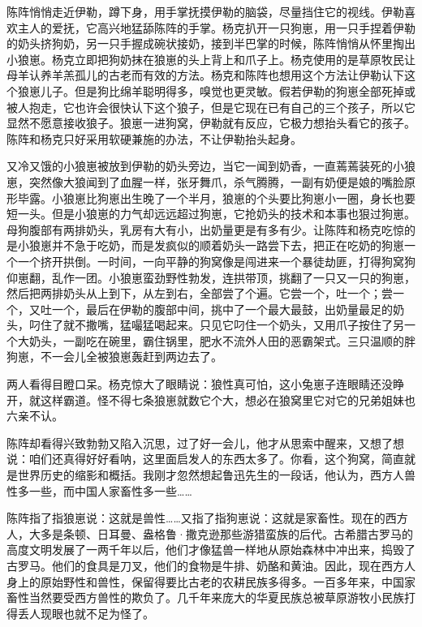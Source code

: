 \par 陈阵悄悄走近伊勒，蹲下身，用手掌抚摸伊勒的脑袋，尽量挡住它的视线。伊勒喜欢主人的爱抚，它高兴地猛舔陈阵的手掌。杨克扒开一只狗崽，用一只手捏着伊勒的奶头挤狗奶，另一只手握成碗状接奶，接到半巴掌的时候，陈阵悄悄从怀里掏出小狼崽。杨克立即把狗奶抹在狼崽的头上背上和爪子上。杨克使用的是草原牧民让母羊认养羊羔孤儿的古老而有效的方法。杨克和陈阵也想用这个方法让伊勒认下这个狼崽儿子。但是狗比绵羊聪明得多，嗅觉也更灵敏。假若伊勒的狗崽全部死掉或被人抱走，它也许会很快认下这个狼子，但是它现在已有自己的三个孩子，所以它显然不愿意接收狼子。狼崽一进狗窝，伊勒就有反应，它极力想抬头看它的孩子。陈阵和杨克只好采用软硬兼施的办法，不让伊勒抬头起身。
\par 又冷又饿的小狼崽被放到伊勒的奶头旁边，当它一闻到奶香，一直蔫蔫装死的小狼崽，突然像大狼闻到了血腥一样，张牙舞爪，杀气腾腾，一副有奶便是娘的嘴脸原形毕露。小狼崽比狗崽出生晚了一个半月，狼崽的个头要比狗崽小一圈，身长也要短一头。但是小狼崽的力气却远远超过狗崽，它抢奶头的技术和本事也狠过狗崽。母狗腹部有两排奶头，乳房有大有小，出奶量更是有多有少。让陈阵和杨克吃惊的是小狼崽并不急于吃奶，而是发疯似的顺着奶头一路尝下去，把正在吃奶的狗崽一个一个挤开拱倒。一时间，一向平静的狗窝像是闯进来一个暴徒劫匪，打得狗窝狗仰崽翻，乱作一团。小狼崽蛮劲野性勃发，连拱带顶，挑翻了一只又一只的狗崽，然后把两排奶头从上到下，从左到右，全部尝了个遍。它尝一个，吐一个；尝一个，又吐一个，最后在伊勒的腹部中间，挑中了一个最大最鼓，出奶量最足的奶头，叼住了就不撒嘴，猛嘬猛喝起来。只见它叼住一个奶头，又用爪子按住了另一个大奶头，一副吃在碗里，霸住锅里，肥水不流外人田的恶霸架式。三只温顺的胖狗崽，不一会儿全被狼崽轰赶到两边去了。
\par 两人看得目瞪口呆。杨克惊大了眼睛说：狼性真可怕，这小兔崽子连眼睛还没睁开，就这样霸道。怪不得七条狼崽就数它个大，想必在狼窝里它对它的兄弟姐妹也六亲不认。
\par 陈阵却看得兴致勃勃又陷入沉思，过了好一会儿，他才从思索中醒来，又想了想说：咱们还真得好好看呐，这里面启发人的东西太多了。你看，这个狗窝，简直就是世界历史的缩影和概括。我刚才忽然想起鲁迅先生的一段话，他认为，西方人兽性多一些，而中国人家畜性多一些……
\par 陈阵指了指狼崽说：这就是兽性……又指了指狗崽说：这就是家畜性。现在的西方人，大多是条顿、日耳曼、盎格鲁·撒克逊那些游猎蛮族的后代。古希腊古罗马的高度文明发展了一两千年以后，他们才像猛兽一样地从原始森林中冲出来，捣毁了古罗马。他们的食具是刀叉，他们的食物是牛排、奶酪和黄油。因此，现在西方人身上的原始野性和兽性，保留得要比古老的农耕民族多得多。一百多年来，中国家畜性当然要受西方兽性的欺负了。几千年来庞大的华夏民族总被草原游牧小民族打得丢人现眼也就不足为怪了。

